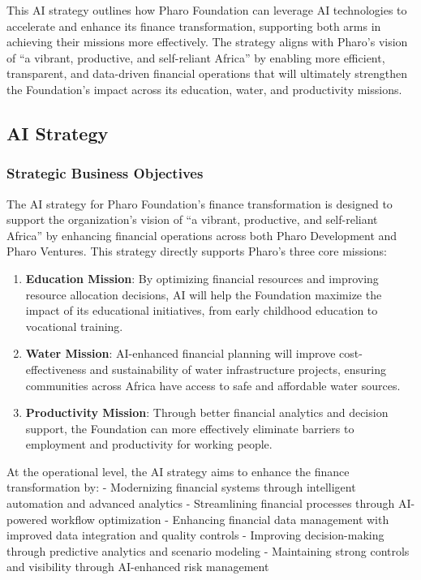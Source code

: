 \documentclass[
]{article}
\begin{document}
This AI strategy outlines how Pharo Foundation can leverage AI
technologies to accelerate and enhance its finance transformation,
supporting both arms in achieving their missions more effectively. The
strategy aligns with Pharo's vision of ``a vibrant, productive, and
self-reliant Africa'' by enabling more efficient, transparent, and
data-driven financial operations that will ultimately strengthen the
Foundation's impact across its education, water, and productivity
missions.

\subsection{AI Strategy}\label{ai-strategy}

\subsubsection{Strategic Business
Objectives}\label{strategic-business-objectives}

The AI strategy for Pharo Foundation's finance transformation is
designed to support the organization's vision of ``a vibrant,
productive, and self-reliant Africa'' by enhancing financial operations
across both Pharo Development and Pharo Ventures. This strategy directly
supports Pharo's three core missions:

\begin{enumerate}
\def\labelenumi{\arabic{enumi}.}
\item
  \textbf{Education Mission}: By optimizing financial resources and
  improving resource allocation decisions, AI will help the Foundation
  maximize the impact of its educational initiatives, from early
  childhood education to vocational training.
\item
  \textbf{Water Mission}: AI-enhanced financial planning will improve
  cost-effectiveness and sustainability of water infrastructure
  projects, ensuring communities across Africa have access to safe and
  affordable water sources.
\item
  \textbf{Productivity Mission}: Through better financial analytics and
  decision support, the Foundation can more effectively eliminate
  barriers to employment and productivity for working people.
\end{enumerate}

At the operational level, the AI strategy aims to enhance the finance
transformation by: - Modernizing financial systems through intelligent
automation and advanced analytics - Streamlining financial processes
through AI-powered workflow optimization - Enhancing financial data
management with improved data integration and quality controls -
Improving decision-making through predictive analytics and scenario
modeling - Maintaining strong controls and visibility through
AI-enhanced risk management
\end{document}
